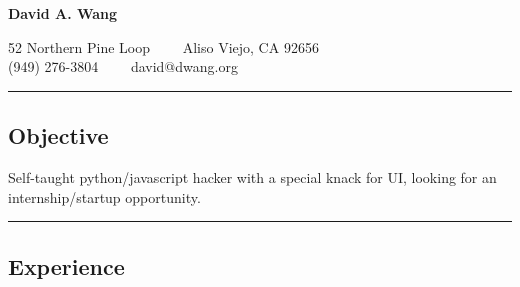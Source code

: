 \documentclass[10pt,letterpaper]{article}
\newenvironment{indentsection}[1]%
{\begin{list}{}%
	{\setlength{\leftmargin}{#1}}%
	\item[]%
}
{\end{list}}
\begin{document}
\begin{center}
{\LARGE \textbf{David A. Wang}}

52 Northern Pine Loop\ \ \textbullet
\ \ Aliso Viejo, CA 92656
\\
(949) 276-3804\ \ \textbullet
\ \ david@dwang.org
\end{center}


\hrule
\vspace{-0.4em}
\subsection*{Objective}
\begin{indentsection}{\parindent}
\begin{description*}
	\item Self-taught python/javascript hacker with a special knack for UI, looking for an internship/startup opportunity.
\end{description*}
\end{indentsection}

\hrule
\vspace{-0.4em}
\subsection*{Experience}
\end{document}
